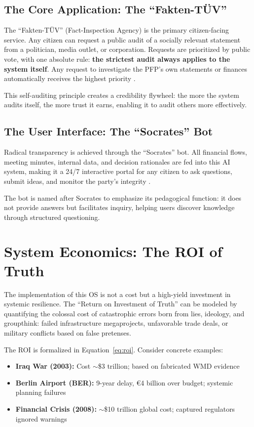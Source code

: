 \documentclass[11pt,a4paper]{article}
\begin{document}
\subsection{The Core Application: The ``Fakten-TÜV''}
The ``Fakten-TÜV'' (Fact-Inspection Agency) is the primary citizen-facing service. Any citizen can request a public audit of a socially relevant statement from a politician, media outlet, or corporation. Requests are prioritized by public vote, with one absolute rule: \textbf{the strictest audit always applies to the system itself}. Any request to investigate the PFP's own statements or finances automatically receives the highest priority \citep[lines 3419--3422]{AnalyticalReport2025}.

This self-auditing principle creates a credibility flywheel: the more the system audits itself, the more trust it earns, enabling it to audit others more effectively.

\subsection{The User Interface: The ``Socrates'' Bot}
Radical transparency is achieved through the ``Socrates'' bot. All financial flows, meeting minutes, internal data, and decision rationales are fed into this AI system, making it a 24/7 interactive portal for any citizen to ask questions, submit ideas, and monitor the party's integrity \citep[lines 3423--3424]{AnalyticalReport2025}.

The bot is named after Socrates to emphasize its pedagogical function: it does not provide answers but facilitates inquiry, helping users discover knowledge through structured questioning.

\section{System Economics: The ROI of Truth}
The implementation of this OS is not a cost but a high-yield investment in systemic resilience. The ``Return on Investment of Truth'' can be modeled by quantifying the colossal cost of catastrophic errors born from lies, ideology, and groupthink: failed infrastructure megaprojects, unfavorable trade deals, or military conflicts based on false pretenses.

The ROI is formalized in Equation~\eqref{eq:roi}. Consider concrete examples:
\begin{itemize}[nosep]
    \item \textbf{Iraq War (2003):} Cost $\sim$\$3 trillion; based on fabricated WMD evidence
    \item \textbf{Berlin Airport (BER):} 9-year delay, €4 billion over budget; systemic planning failures
    \item \textbf{Financial Crisis (2008):} $\sim$\$10 trillion global cost; captured regulators ignored warnings
\end{itemize}
\end{document}
